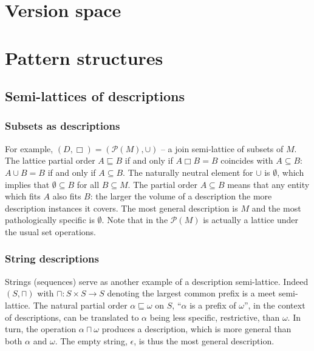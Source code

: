 \documentclass[a4paper]{article}
\newcommand{\brac}[1]{{\left ( #1 \right )}}
\newcommand{\Pwr}{\mathcal{P}}
\begin{document}


\section{Version space} %
\label{sec:version_space}


\section{Pattern structures} %
\label{sec:pattern_structures}

\subsection{Semi-lattices of descriptions} %
\label{sub:semi_lattices_of_descriptions}

\subsubsection*{Subsets as descriptions} %
\label{ssub:subsets_as_descriptions}

For example, $(D,\Box) = \brac{\Pwr(M), \cup}$ -- a join semi-lattice of subsets of $M$. The lattice partial order $A\sqsubseteq B$ if and only if $A\Box B = B$ coincides with $A\subseteq B$: $A\cup B = B$ if and only if $A\subseteq B$. The naturally neutral element for $\cup$ is $\emptyset$, which implies that $\emptyset\subseteq B$ for all $B\subseteq M$. The partial order $A\subseteq B$ means that any entity which fits $A$ also fits $B$: the larger the volume of a description the more description instances it covers. The most general description is $M$ and the most pathologically specific is $\emptyset$. Note that in the $\Pwr(M)$ is actually a lattice under the usual set operations.


\subsubsection*{String descriptions} %
\label{ssub:string_descriptions}

Strings (sequences) serve as another example of a description semi-lattice. Indeed $\brac{S,\sqcap}$ with $\sqcap:S\times S\to S$ denoting the largest common prefix is a meet semi-lattice. The natural partial order $\alpha\sqsubseteq\omega$ on $S$, ``$\alpha$ is a prefix of $\omega$'', in the context of descriptions, can be translated to $\alpha$ being less specific, restrictive, than $\omega$. In turn, the operation $\alpha\sqcap\omega$ produces a description, which is more general than both $\alpha$ and $\omega$. The empty string, $\epsilon$, is thus the most general description.
\end{document}

